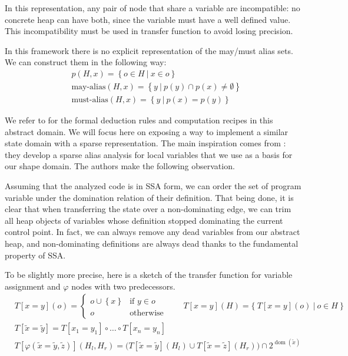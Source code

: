 \documentclass[11pt]{article}
\renewcommand{\phi}{\varphi}
\DeclareMathOperator{\dom}{dom}
\begin{document}
In this representation, any pair of node that share a variable are incompatible: no concrete heap can have both, since the variable must have a well defined value.
This incompatibility must be used in transfer function to avoid losing precision.

In this framework there is no explicit representation of the may/must alias sets.
We can construct them in the following way:
\begin{align*}
& p(H,x) = \left\{ o \in H ~|~ x \in o \right\} \\
& \text{may-alias}(H,x) = \left\{ y~|~ p(y)\cap p(x) \neq \emptyset \right\} \\
& \text{must-alias}(H,x) = \left\{ y~|~ p(x) = p(y) \right\}
\end{align*}

We refer to \cite{ssc} for the formal deduction rules and computation recipes in this abstract domain.
We will focus here on exposing a way to implement a similar state domain with a sparse representation.
The main inspiration comes from \cite{ssa-alias}: they develop a sparse alias analysis for local variables that we use as a basis for our shape domain. The authors make the following observation.

Assuming that the analyzed code is in SSA form, we can order the set of program variable under the domination relation of their definition.
That being done, it is clear that when transferring the state over a non-dominating edge, we can trim all heap objects of variables whose definition stopped dominating the current control point. In fact, we can always remove any dead variables from our abstract heap, and non-dominating definitions are always dead thanks to the fundamental property of SSA.

To be slightly more precise, here is a sketch of the transfer function for variable assignment and $\phi$ nodes with two predecessors.
\[
\begin{aligned}
&T[x=y](o) = \begin{cases}
o \cup \left\{ x \right\} & \text{if } y \in o \\
o & \text{otherwise}
\end{cases}
\qquad
T[x=y](H) = \Big\{~T[x=y](o)~|~o \in H~\Big\} \\
& T[\tilde{x}=\tilde{y}] = T[x_1=y_1]\circ\dots\circ T[x_n=y_n] \\
&T[\phi(\tilde{x}=\tilde{y},\tilde{z})](H_l,H_r) = \big( T[\tilde{x}=\tilde{y}](H_l)\cup T[\tilde{x}=\tilde{z}](H_r) \big)\cap 2^{\dom(\tilde{x})}
\end{aligned}
\]
\end{document}
